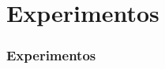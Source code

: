 \section{Experimentos}
\label{sec:experiments}

\contentscurrent

\begin{frame}
\frametitle{Experimentos}
\end{frame}